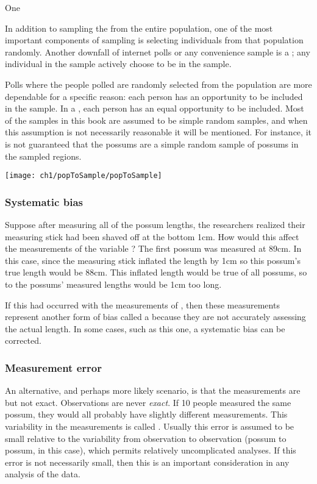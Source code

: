 One 

In addition to sampling the from the entire population, one of the most important components of sampling is selecting individuals from that population randomly. Another downfall of internet polls or any convenience sample is a ; any individual in the sample actively choose to be in the sample.


Polls where the people polled are randomly selected from the population are more dependable for a specific reason: each person has an opportunity to be included in the sample. In a , each person has an equal opportunity to be included. Most of the samples in this book are assumed to be simple random samples, and when this assumption is not necessarily reasonable it will be mentioned. For instance, it is not guaranteed that the possums are a simple random sample of possums in the sampled regions.
\begin{center}
   \texttt{[image: ch1/popToSample/popToSample]}
\end{center}


\subsubsection{Systematic bias}

\begin{example}{Suppose after measuring all of the possum lengths, the researchers realized their measuring stick had been shaved off at the bottom 1cm. How would this affect the measurements of the variable ?}
The first possum was measured at 89cm. In this case, since the measuring stick inflated the length by 1cm so this possum's true length would be 88cm. This inflated length would be true of all possums, so to the possums' measured lengths would be 1cm too long.
\end{example}

If this had occurred with the measurements of , then these measurements represent another form of bias called a  because they are not accurately assessing the actual length. In some cases, such as this one, a systematic bias can be corrected.

\subsubsection{Measurement error}

An alternative, and perhaps more likely scenario, is that the measurements are  but not exact. Observations are never \emph{exact}. If 10 people measured the same possum, they would all probably have slightly different measurements. This variability in the measurements is called . Usually this error is assumed to be small relative to the variability from observation to observation (possum to possum, in this case), which permits relatively uncomplicated analyses. If this error is not necessarily small, then this is an important consideration in any analysis of the data.

